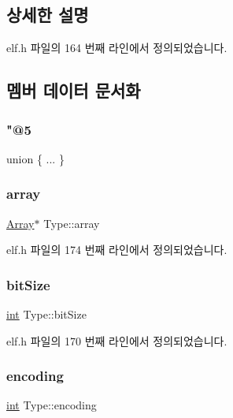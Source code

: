 \subsection{상세한 설명}


elf.\+h 파일의 164 번째 라인에서 정의되었습니다.



\subsection{멤버 데이터 문서화}
\mbox{\label{struct_type_a6ec0777bfd5d60479a928f2253ef397f}} 
\subsubsection{\texorpdfstring{"@5}{@5}}
{\footnotesize\ttfamily union \{ ... \} }

\mbox{\label{struct_type_a5144affb9491fc424e1a8a4ee315d001}} 
\subsubsection{\texorpdfstring{array}{array}}
{\footnotesize\ttfamily \mbox{\hyperlink{struct_array}{Array}}$\ast$ Type\+::array}



elf.\+h 파일의 174 번째 라인에서 정의되었습니다.

\mbox{\label{struct_type_a15eb0924ca4d483bf9dd0d7e4029b60c}} 
\subsubsection{\texorpdfstring{bit\+Size}{bitSize}}
{\footnotesize\ttfamily \mbox{\hyperlink{_util_8cpp_a0ef32aa8672df19503a49fab2d0c8071}{int}} Type\+::bit\+Size}



elf.\+h 파일의 170 번째 라인에서 정의되었습니다.

\mbox{\label{struct_type_a8a28b973d98063a67755e710d6383feb}} 
\subsubsection{\texorpdfstring{encoding}{encoding}}
{\footnotesize\ttfamily \mbox{\hyperlink{_util_8cpp_a0ef32aa8672df19503a49fab2d0c8071}{int}} Type\+::encoding}



